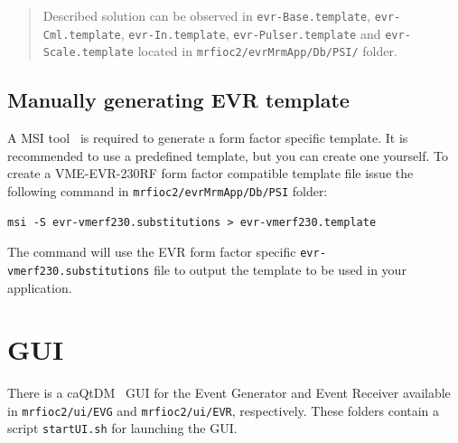 \documentclass[12pt,a4paper]{article}
\let\stdsection\section
\renewcommand\section{\newpage\stdsection}
\begin{document}
\begin{quote}
Described solution can be observed in \texttt{evr-Base.template},
\texttt{evr-Cml.template}, \texttt{evr-In.template},
\texttt{evr-Pulser.template} and \texttt{evr-Scale.template} located in
\texttt{mrfioc2/evrMrmApp/Db/PSI/} folder.
\end{quote}

\subsection{Manually generating EVR template}\label{manually-generating-evr-template}
A MSI tool~\cite{msi} is required to generate a form factor specific template. It
is recommended to use a predefined template, but you can create one
yourself. To create a VME-EVR-230RF form factor compatible template file issue the following command in \texttt{mrfioc2/evrMrmApp/Db/PSI} folder:

\begin{verbatim}
msi -S evr-vmerf230.substitutions > evr-vmerf230.template 
\end{verbatim}

The command will use the EVR form factor specific \texttt{evr-vmerf230.substitutions}
file to output the template to be used in your application.






\section{GUI}\label{sec:GUI}
There is a caQtDM~\cite{caqtdm} GUI for the Event Generator and Event Receiver available in \texttt{mrfioc2/ui/EVG} and \texttt{mrfioc2/ui/EVR}, respectively. These folders contain a script \texttt{startUI.sh} for launching the GUI.
\end{document}
